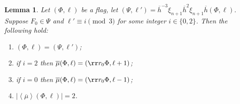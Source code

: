 \documentclass[final]{amsart}
\theoremstyle{plain}
\newtheorem{lemma}[thm]{Lemma}
\theoremstyle{definition}
\theoremstyle{remark}
\numberwithin{equation}{section}
\renewcommand{\{}{\lbrace}
\renewcommand{\}}{\rbrace}
\renewcommand{\bar}{\overline}
\newcommand{\kng}{{h}}
\newcommand{\etab}{\bar{\kng}}
\newcommand{\mub}{\bar{\mu}}
\newcommand{\te}{\xi}
\begin{document}
\begin{lemma}\label{lem:chapulines3}
Let $(\Phi,\ell)$ be a flag, let $(\Psi,\ell') =  \etab^{-3} \te_{n+1} \etab^{2} \te_{n+1} \etab (\Phi,\ell)$. Suppose $F_0 \in \Psi$ and $\ell' \equiv i \pmod 3$ for some integer $i\in \{0,2\}$. Then the following hold:
\begin{enumerate}
    \item \label{item:chapulines31} $(\Phi,\ell) = (\Psi, \ell')$;
    \item \label{item:chapulines32} if $i = 2$ then $\mub(\Phi,\ell) = (\rr r_0 \Phi,\ell+1)$;
    \item \label{item:chapulines33} if $i = 0$ then $\mub(\Phi,\ell) = (\rr r_0 \Phi,\ell-1)$;
    \item \label{item:chapulines34}$|\left\langle \mub \right\rangle (\Phi,\ell)| = 2$.
\end{enumerate}

\end{lemma}
\end{document}
